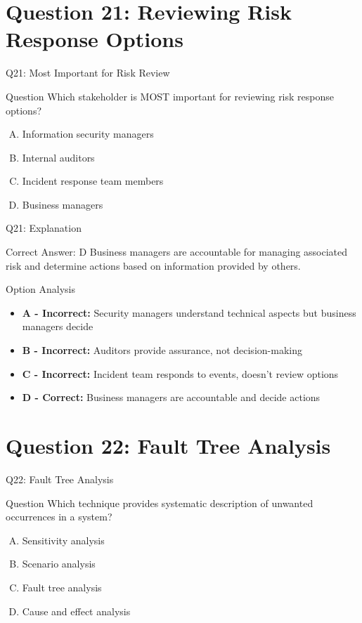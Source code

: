 \documentclass{beamer}
\begin{document}
	\section{Question 21: Reviewing Risk Response Options}
	
	\begin{frame}{Q21: Most Important for Risk Review}
		\begin{block}{Question}
			Which stakeholder is MOST important for reviewing risk response options?
		\end{block}
		\begin{enumerate}[(A)]
			\item Information security managers
			\item Internal auditors
			\item Incident response team members
			\item Business managers
		\end{enumerate}
	\end{frame}
	
	\begin{frame}{Q21: Explanation}
		\begin{block}{Correct Answer: D}
			Business managers are accountable for managing associated risk and determine actions based on information provided by others.
		\end{block}
		\begin{block}{Option Analysis}
			\begin{itemize}
				\item \textbf{A - Incorrect:} Security managers understand technical aspects but business managers decide
				\item \textbf{B - Incorrect:} Auditors provide assurance, not decision-making
				\item \textbf{C - Incorrect:} Incident team responds to events, doesn't review options
				\item \textbf{D - Correct:} Business managers are accountable and decide actions
			\end{itemize}
		\end{block}
	\end{frame}
	
	\section{Question 22: Fault Tree Analysis}
	
	\begin{frame}{Q22: Fault Tree Analysis}
		\begin{block}{Question}
			Which technique provides systematic description of unwanted occurrences in a system?
		\end{block}
		\begin{enumerate}[(A)]
			\item Sensitivity analysis
			\item Scenario analysis
			\item Fault tree analysis
			\item Cause and effect analysis
		\end{enumerate}
	\end{frame}
	
\end{document}

